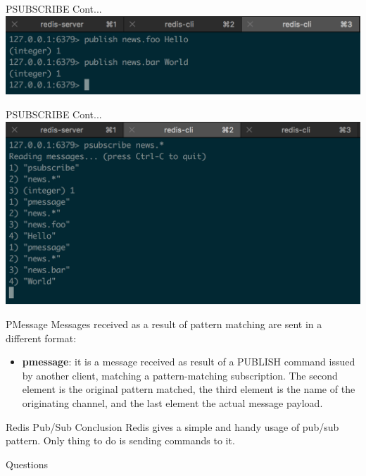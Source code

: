 \documentclass[10pt]{beamer}
\begin{document}
\begin{frame}[fragile]{PSUBSCRIBE Cont...}
  \includegraphics[scale=0.5]{img/publish-psubscribe}
\end{frame}

\begin{frame}[fragile]{PSUBSCRIBE Cont...}
  \includegraphics[scale=0.5]{img/psubscribe-message}
\end{frame}

\begin{frame}[fragile]{PMessage}
  Messages received as a result of pattern matching are sent in a different format:
  \begin{itemize}
    \item \textbf{pmessage}: it is a message received as result of a PUBLISH
    command issued by another client, matching a pattern-matching subscription.
    The second element is the original pattern matched, the third element is the
    name of the originating channel, and the last element the actual message
    payload.
  \end{itemize}
\end{frame}

\begin{frame}[fragile]{Redis Pub/Sub Conclusion}
  Redis gives a simple and handy usage of pub/sub pattern. Only thing to do is
  sending commands to it.
\end{frame}

\begin{frame}[fragile]{Questions}
\end{frame}
\end{document}
